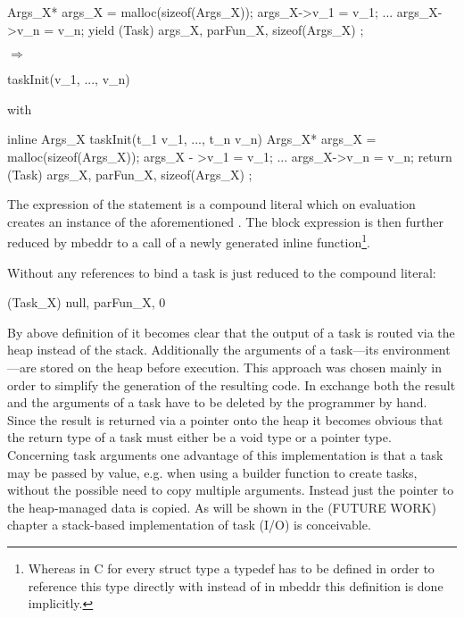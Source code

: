 \begin{minipage}{0.4\textwidth}
\begin{ccode}
{
  Args_X* args_X = malloc(sizeof(Args_X));
  args_X->v_1 = v_1;
  ...
  args_X->v_n = v_n;
  yield (Task){ args_X, parFun_X, sizeof(Args_X) };
}
\end{ccode}
\end{minipage}
\begin{minipage}{0.2\textwidth}
$\Longrightarrow$
\end{minipage}
\begin{minipage}{0.4\textwidth}
\begin{ccode}
taskInit(v_1, ..., v_n)
\end{ccode}
with
\begin{ccode}
inline Args_X taskInit(t_1 v_1, ..., t_n v_n) {
  Args_X* args_X = malloc(sizeof(Args_X));
  args_X - >v_1 = v_1;
  ...
  args_X->v_n = v_n;
  return (Task){ args_X, parFun_X, sizeof(Args_X) };
}
\end{ccode}
\end{minipage}

The expression of the  statement is a compound literal which on evaluation creates an instance of the aforementioned . The block expression is then further reduced by mbeddr to a call of a newly generated inline function\footnote{Whereas in C for every struct type  a typedef has to be defined in order to reference this type directly with  instead of  in mbeddr this definition is done implicitly.}.

Without any references to bind a task is just reduced to the compound literal:

\begin{ccode}
(Task_X){ null, parFun_X, 0 }
\end{ccode}

By above definition of  it becomes clear that the output of a task is routed via the heap instead of the stack. Additionally the arguments of a task---its environment---are stored on the heap before execution. This approach was chosen mainly in order to simplify the generation of the resulting code. In exchange both the result and the arguments of a task have to be deleted by the programmer by hand. Since the result is returned via a pointer onto the heap it becomes obvious that the return type of a task must either be a void type or a pointer type. Concerning task arguments one advantage of this implementation is that a task may be passed by value, e.g. when using a builder function to create tasks, without the possible need to copy multiple arguments. Instead just the pointer to the heap-managed data is copied. As will be shown in the (FUTURE WORK) chapter a stack-based implementation of task (I/O) is conceivable. 

